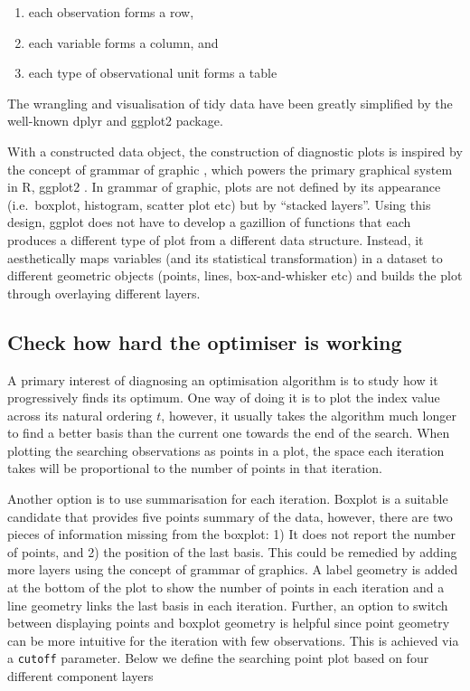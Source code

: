 \documentclass[12pt]{article}
\providecommand{\tightlist}{%
  \setlength{\itemsep}{0pt}\setlength{\parskip}{0pt}}
\begin{document}
\begin{enumerate}
\def\labelenumi{\arabic{enumi})}
\tightlist
\item
  each observation forms a row,
\item
  each variable forms a column, and
\item
  each type of observational unit forms a table
\end{enumerate}

The wrangling and visualisation of tidy data have been greatly simplified by the well-known dplyr\citep{dplyr} and ggplot2\citep{ggplot2} package.

With a constructed data object, the construction of diagnostic plots is inspired by the concept of grammar of graphic \citep{wickham2010layered}, which powers the primary graphical system in R, ggplot2 \citep{ggplot2}. In grammar of graphic, plots are not defined by its appearance (i.e.~boxplot, histogram, scatter plot etc) but by ``stacked layers''. Using this design, ggplot does not have to develop a gazillion of functions that each produces a different type of plot from a different data structure. Instead, it aesthetically maps variables (and its statistical transformation) in a dataset to different geometric objects (points, lines, box-and-whisker etc) and builds the plot through overlaying different layers.

\hypertarget{check-how-hard-the-optimiser-is-working}{%
\subsection{Check how hard the optimiser is working}\label{check-how-hard-the-optimiser-is-working}}

A primary interest of diagnosing an optimisation algorithm is to study how it progressively finds its optimum. One way of doing it is to plot the index value across its natural ordering \(t\), however, it usually takes the algorithm much longer to find a better basis than the current one towards the end of the search.
When plotting the searching observations as points in a plot, the space each iteration takes will be proportional to the number of points in that iteration.

Another option is to use summarisation for each iteration. Boxplot is a suitable candidate that provides five points summary of the data, however, there are two pieces of information missing from the boxplot: 1) It does not report the number of points, and 2) the position of the last basis. This could be remedied by adding more layers using the concept of grammar of graphics. A label geometry is added at the bottom of the plot to show the number of points in each iteration and a line geometry links the last basis in each iteration. Further, an option to switch between displaying points and boxplot geometry is helpful since point geometry can be more intuitive for the iteration with few observations. This is achieved via a \texttt{cutoff} parameter. Below we define the searching point plot based on four different component layers
\end{document}
